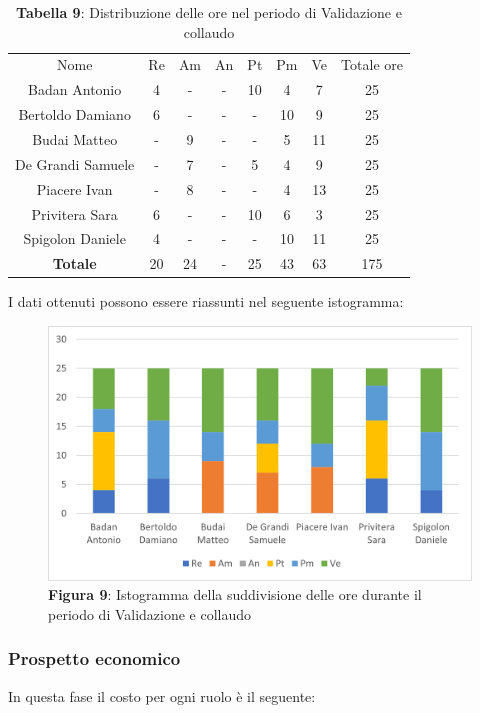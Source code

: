 \begin{table}[H]
	\centering
	\renewcommand{\arraystretch}{1.5}
	\begin{tabular}{|c|c|c|c|c|c|c|c|}
		\hline
		\rowcolor{lighter-grayer}
		Nome & Re & Am & An & Pt & Pm & Ve & Totale ore\\
Badan Antonio     & 4  & - & - & 10 & 4  & 7  & 25  \\ \hline
Bertoldo Damiano  & 6  & - & - & - & 10 & 9  & 25  \\ \hline
Budai Matteo      & - & 9  & - & - & 5  & 11 & 25  \\ \hline
De Grandi Samuele & - & 7  & - & 5  & 4  & 9  & 25  \\ \hline
Piacere Ivan      & - & 8  & - & - & 4  & 13 & 25  \\ \hline
Privitera Sara    & 6  & - & - & 10 & 6  & 3  & 25  \\ \hline
Spigolon Daniele  & 4  & - & - & - & 10 & 11 & 25  \\ \hline
\textbf{Totale}   & 20 & 24 & - & 25 & 43 & 63 & 175 \\ \hline
	\end{tabular}
	\caption*{\textbf{Tabella 9}: Distribuzione delle ore nel periodo di Validazione e collaudo\\}
\end{table}	
	I dati ottenuti possono essere riassunti nel seguente istogramma:

\begin{figure}[H]
	\centering
	\includegraphics[width=0.7\linewidth]{res/images/Figura11.png}
	\caption*{\textbf{Figura 9}: Istogramma della suddivisione delle ore durante il periodo di Validazione e collaudo}
	\label{fig:Figura10}
\end{figure}
	
	
\subsubsection{Prospetto economico}
In questa fase il costo per ogni ruolo è il seguente:

